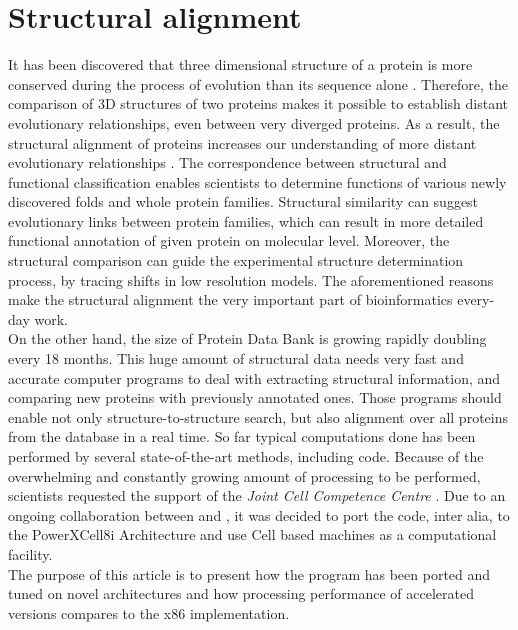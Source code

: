 \section{Structural alignment}
It has been discovered that three dimensional structure of a protein is more
conserved during the process of evolution than its sequence alone \cite{chle}.
Therefore, the comparison of 3D structures of two proteins makes it possible to
establish distant evolutionary relationships, even between very diverged proteins.
As a result, the structural alignment of proteins increases our understanding of
more distant evolutionary relationships \cite{buj2000,jms}.
The correspondence between structural and functional classification enables
scientists to determine functions of various newly discovered folds and whole
protein families. Structural similarity can suggest evolutionary links between protein
families, which can result in more detailed functional annotation
of given protein on molecular level.
Moreover, the structural comparison can guide the experimental structure
determination process, by tracing shifts in low resolution
models.
The aforementioned reasons make the structural alignment the 
very important part of bioinformatics every-day work.\\
On the other hand, the size of Protein Data Bank \cite{pdb} 
is growing rapidly doubling every 18 months.
This huge amount of structural data needs very fast and accurate computer programs to deal
with extracting structural information, and comparing new proteins with previously 
annotated ones.
Those programs should enable not only
structure-to-structure search, but also alignment over all proteins from the
database in a real time.
So far typical computations done has been performed by several state-of-the-art methods,
including \prog{} code.
Because of the overwhelming and constantly growing 
amount of processing to be performed, scientists requested
the support of the \emph{Joint Cell Competence Centre} \cite{jccc}.
Due to an ongoing collaboration between \icm{} and \ibm{}, it was decided to
port the \prog{} code, inter alia, to the PowerXCell8i Architecture and use Cell
based machines as a computational facility.\\
The purpose of this article is to present how the \prog{} program has been
ported and tuned on novel architectures and how processing performance of
accelerated versions compares to the x86 implementation.

